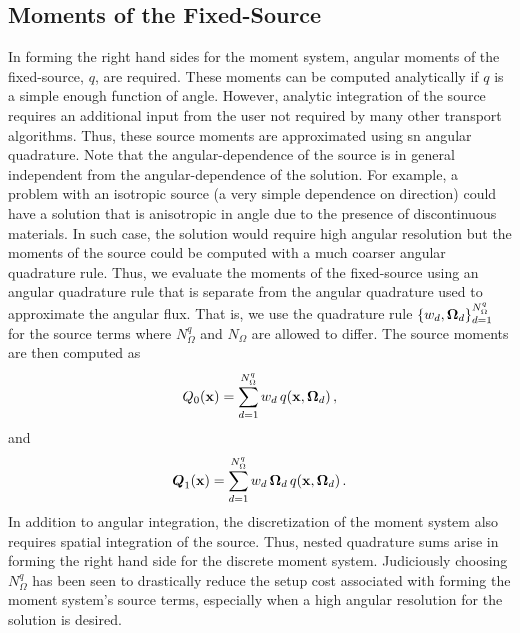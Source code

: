 \documentclass[../doc.tex]{subfiles}
\begin{document}
\subsection{Moments of the Fixed-Source}
In forming the right hand sides for the moment system, angular moments of the fixed-source, $q$, are required. These moments can be computed analytically if $q$ is a simple enough function of angle. However, analytic integration of the source requires an additional input from the user not required by many other transport algorithms. Thus, these source moments are approximated using \gls{sn} angular quadrature. Note that the angular-dependence of the source is in general independent from the angular-dependence of the solution. For example, a problem with an isotropic source (a very simple dependence on direction) could have a solution that is anisotropic in angle due to the presence of discontinuous materials. In such case, the solution would require high angular resolution but the moments of the source could be computed with a much coarser angular quadrature rule. Thus, we evaluate the moments of the fixed-source using an angular quadrature rule that is separate from the angular quadrature used to approximate the angular flux. That is, we use the quadrature rule $\{w_d,\boldsymbol{\Omega}_d\}_{d=1}^{N_\Omega^q}$ for the source terms where $N_\Omega^q$ and $N_\Omega$ are allowed to differ. The source moments are then computed as 
	\begin{equation}
		Q_0(\boldsymbol{\mathrm{x}}) = \sum_{d=1}^{N_\Omega^q} w_d\, q(\boldsymbol{\mathrm{x}},\boldsymbol{\Omega}_d) \,,
	\end{equation}
and 
	\begin{equation}
		\boldsymbol{Q}_1(\boldsymbol{\mathrm{x}}) = \sum_{d=1}^{N_\Omega^q} w_d\,\boldsymbol{\Omega}_d\,q(\boldsymbol{\mathrm{x}},\boldsymbol{\Omega}_d) \,. 
	\end{equation}
In addition to angular integration, the discretization of the moment system also requires spatial integration of the source. Thus, nested quadrature sums arise in forming the right hand side for the discrete moment system. Judiciously choosing $N_\Omega^q$ has been seen to drastically reduce the setup cost associated with forming the moment system's source terms, especially when a high angular resolution for the solution is desired. 
\end{document}
